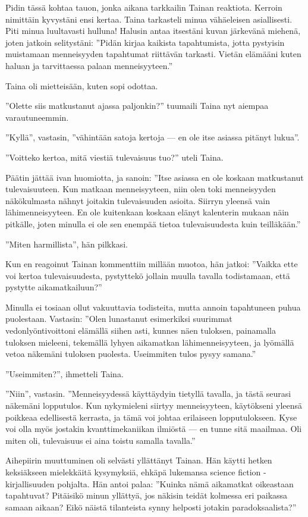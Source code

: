 ﻿\documentclass[a4paper, 12pt, finnish]{article}
\newcommand{\q}[1]{''#1''}
\begin{document}
Pidin tässä kohtaa
tauon, jonka aikana tarkkailin Tainan reaktiota.
Kerroin nimittäin kyvystäni ensi kertaa. Taina tarkasteli
minua vähäeleisen asiallisesti. Piti minua luultavasti hulluna!
Halusin antaa itsestäni kuvan järkevänä miehenä, joten
jatkoin selitystäni: \q{Pidän kirjaa kaikista tapahtumista,
jotta pystyisin muistamaan menneisyyden tapahtumat riittävän
tarkasti. Vietän elämääni kuten haluan ja tarvittaessa
palaan menneisyyteen.}

Taina oli mietteisään, kuten sopi odottaa.

\q{Olette siis matkustanut ajassa paljonkin?} tuumaili Taina nyt
aiempaa varautuneemmin.

\q{Kyllä}, vastasin, \q{vähintään satoja kertoja --- en ole
itse asiassa pitänyt lukua}.

\q{Voitteko kertoa, mitä viestiä tulevaisuus tuo?} uteli Taina.

Päätin jättää ivan huomiotta, ja sanoin:
\q{Itse asiassa en ole koskaan matkustanut
tulevaisuuteen. Kun matkaan menneisyyteen, niin
olen toki menneisyyden näkökulmasta nähnyt joitakin
tulevaisuuden asioita. Siirryn yleensä vain
lähimenneisyyteen. En ole kuitenkaan koskaan elänyt
kalenterin mukaan näin pitkälle, joten minulla
ei ole sen enempää tietoa tulevaisuudesta kuin teilläkään.}

\q{Miten harmillista}, hän pilkkasi.

Kun en reagoinut Tainan kommenttiin millään muotoa, hän jatkoi:
\q{Vaikka ette voi kertoa tulevaisuudesta, pystyttekö jollain muulla
tavalla todistamaan, että pystytte aikamatkailuun?}

Minulla ei tosiaan ollut vakuuttavia todisteita, mutta annoin tapahtuneen
puhua puolestaan. Vastasin: \q{Olen lunastanut esimerkiksi
suurimmat vedonlyöntivoittoni elämällä siihen asti,
kunnes näen tuloksen, painamalla tuloksen mieleeni,
tekemällä lyhyen aikamatkan lähimenneisyyteen,
ja lyömällä vetoa näkemäni tuloksen puolesta. Useimmiten tulos pysyy samana.}

\q{Useimmiten?}, ihmetteli Taina.

\q{Niin}, vastasin. \q{Menneisyydessä käyttäydyin tietyllä tavalla,
ja tästä seurasi näkemäni lopputulos. Kun nykymieleni siirtyy
menneisyyteen, käytökseni yleensä poikkeaa edellisestä kerrasta,
ja tämä voi johtaa erilaiseen lopputulokseen. Kyse voi olla myös
jostakin kvanttimekaniikan ilmiöstä --- en tunne sitä maailmaa.
Oli miten oli, tulevaisuus ei aina toistu samalla tavalla.}

Aihepiirin muuttuminen oli selvästi yllättänyt Tainan.
Hän käytti hetken keksiäkseen mielekkäitä kysymyksiä, ehkäpä
lukemansa science fiction -kirjallisuuden pohjalta. Hän antoi palaa: 
\q{Kuinka nämä aikamatkat oikeastaan tapahtuvat? Pitäisikö minun yllättyä, jos
näkisin teidät kolmessa eri paikassa samaan aikaan? Eikö näistä
tilanteista synny helposti jotakin paradoksaalista?}
\end{document}
